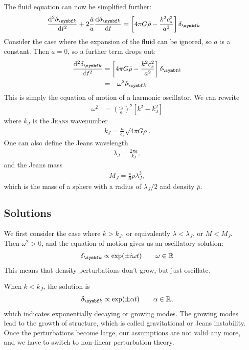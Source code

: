 The fluid equation can now be simplified further:
\begin{align*}
	\dv[2]{\delta_{\vec{k}}}{t} + 2 \frac{\dot{a}}{a} \dv{\delta_{\vec{k}}}{t}
	&= \left[4 \pi G \bar{\rho} - \frac{k^2 c_s^2}{a^2}\right] \delta_{\vec{k}}
\end{align*}
Consider the case where the expansion of the fluid can be ignored, so $a$ is a constant. Then $\dot{a} = 0$, so a further term drops out:
\begin{align*}
	\dv[2]{\delta_{\vec{k}}}{t}
	&= \left[4 \pi G \bar{\rho} - \frac{k^2 c_s^2}{a^2}\right] \delta_{\vec{k}}\\
	&= - \omega^2 \delta_{\vec{k}}
\end{align*}
This is simply the equation of motion of a harmonic oscillator. We can rewrite
\begin{align*}
	\omega^2
	&= \left( \frac{c_s}{a} \right)^2 [k^2 - k_J^2]
\end{align*}
where $k_J$ is the \textsc{Jeans} wavenumber
\begin{align*}
	k_J = \frac{a}{c_s} \sqrt{4 \pi G \bar{\rho}}.
\end{align*}
One can also define the Jeans wavelength
\begin{align*}
	\lambda_J = \frac{2 \pi a}{k_J},
\end{align*}
and the Jeans mass
\begin{align*}
	M_J = \frac{\pi}{6} \bar{\rho} \lambda_J^3,
\end{align*}
which is the mass of a sphere with a radius of $\lambda_J/2$ and density $\bar{\rho}$.

\subsection*{Solutions}

We first consider the case where $k > k_J$, or equivalently $\lambda < \lambda_J$, or $M < M_J$. Then $\omega^2 > 0$, and the equation of motion gives us an oscillatory solution:
\begin{align*}
	\delta_{\vec{k}} \propto \exp(\pm i \omega t)
	\qquad \omega \in \R
\end{align*}
This means that density perturbations don't grow, but just oscillate.

When $k < k_J$, the solution is
\begin{align*}
	\delta_{\vec{k}} \propto \exp(\pm \alpha t) \qquad \alpha \in \R,
\end{align*}
which indicates exponentially decaying or growing modes. The growing modes lead to the growth of structure, which is called gravitational or Jeans instability. Once the perturbations become large, our assumptions are not valid any more, and we have to switch to non-linear perturbation theory.

